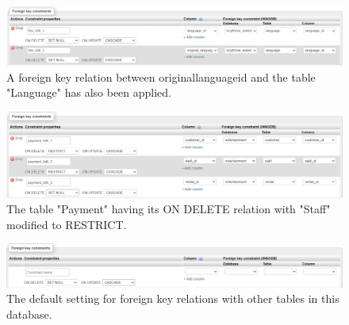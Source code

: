 \documentclass[openany]{article}
\begin{document}
		\begin{figure}[H]
			\includegraphics[width=\textwidth]{table_film_norm_fk}
			\caption{A foreign key relation between original\textunderscore language\textunderscore id and the table "Language" has also been applied.}
		\end{figure}
		\begin{figure}[H]
			\includegraphics[width=\textwidth]{staff_restrict}
			\caption{The table "Payment" having its ON DELETE relation with "Staff" modified to RESTRICT.}
		\end{figure}
		\begin{figure}[H]
			\includegraphics[width=\textwidth]{setnull_cascade}
			\caption{The default setting for foreign key relations with other tables in this database.}
		\end{figure}
\end{document}

